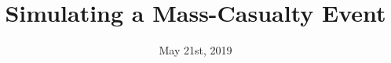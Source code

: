 \documentclass{beamer}
\begin{document}
\newcommand{\clg}{\mathcal{G}}
\newcommand{\clb}{\mathcal{B}}
\newcommand{\cls}{\mathcal{S}}
\newcommand{\clc}{\mathcal{C}}
\newcommand{\clj}{\mathcal{J}}
\newcommand{\clm}{\mathcal{M}}
\newcommand{\clx}{\mathcal{X}}
\newcommand{\cld}{\mathcal{D}}
\newcommand{\cle}{\mathcal{E}}
\newcommand{\clv}{\mathcal{V}}
\newcommand{\clu}{\mathcal{U}}
\newcommand{\clr}{\mathcal{R}}
\newcommand{\clt}{\mathcal{T}}
\newcommand{\cll}{\mathcal{L}}
\newcommand{\clz}{\mathcal{Z}}
\newcommand{\clq}{\mathcal{Q}}

\newcommand{\cli}{\mathcal{I}}
\newcommand{\clp}{\mathcal{P}}
\newcommand{\cla}{\mathcal{A}}
\newcommand{\clf}{\mathcal{F}}
\newcommand{\clh}{\mathcal{H}}
\newcommand{\clo}{\mathcal{O}}
\newcommand{\N}{\mathbb{N}}
\newcommand{\Q}{\mathbb{Q}}
\newcommand{\bfx}{{\boldsymbol{x}}}
\newcommand{\bfa}{{\boldsymbol{a}}}
\newcommand{\bfh}{{\boldsymbol{h}}}
\newcommand{\bfs}{{\boldsymbol{s}}}
\newcommand{\bfm}{{\boldsymbol{m}}}
\newcommand{\bff}{{\boldsymbol{f}}}
\newcommand{\bfb}{{\boldsymbol{b}}}
\newcommand{\bfw}{{\boldsymbol{w}}}
\newcommand{\bfz}{{\boldsymbol{z}}}
\newcommand{\bfu}{{\boldsymbol{u}}}
\newcommand{\bfell}{{\boldsymbol{\ell}}}
\newcommand{\bfn}{{\boldsymbol{n}}}
\newcommand{\bfd}{{\boldsymbol{d}}}
\newcommand{\bfbeta}{{\boldsymbol{\beta}}}
\newcommand{\bfzeta}{{\boldsymbol{\zeta}}}
\newcommand{\bfnu}{{\boldsymbol{\nu}}}
\newcommand{\bfvarphi}{{\boldsymbol{\varphi}}}

\newcommand{\curvz}{{\bf \mathpzc{z}}}
\newcommand{\curvx}{{\bf \mathpzc{x}}}
\newcommand{\curvi}{{\bf \mathpzc{i}}}
\newcommand{\curvs}{{\bf \mathpzc{s}}}
\newcommand{\blip}{\mathbb{B}_1}

\newcommand{\BM}{\mbox{BM}}

\newcommand{\tac}{\mbox{\scriptsize{AC}}}

\title[Triage]{Simulating a Mass-Casualty Event} %

\date{May 21st, 2019} %
\end{document}
